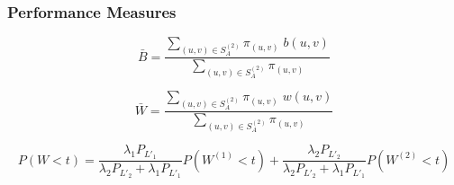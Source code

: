 \begin{frame}
    \frametitle{Performance Measures}
    \centering
    \small

    \begin{equation*}
        \bar{B} = \frac{\sum_{(u,v) \in S_A^{(2)}} \pi_{(u,v)} \; 
        b(u,v)}{\sum_{(u,v) \in S_A^{(2)}} \pi_{(u,v)}}
    \end{equation*}

    \begin{equation*}
        \bar{W} = \frac{\sum_{(u,v) \in S_A^{(2)}} \pi_{(u,v)} \; 
        w(u,v)}{\sum_{(u,v) \in S_A^{(2)}} \pi_{(u,v)}}
    \end{equation*}
    
    \begin{equation*}
        P(W < t) = \frac{\lambda_1 P_{L'_1}}{\lambda_2 P_{L'_2}+\lambda_1 P_{L'_1}} 
        P(W^{(1)} < t) + \frac{\lambda_2 P_{L'_2}}{\lambda_2 P_{L'_2} + 
        \lambda_1 P_{L'_1}}P(W^{(2)} < t) 
    \end{equation*}
\end{frame}

